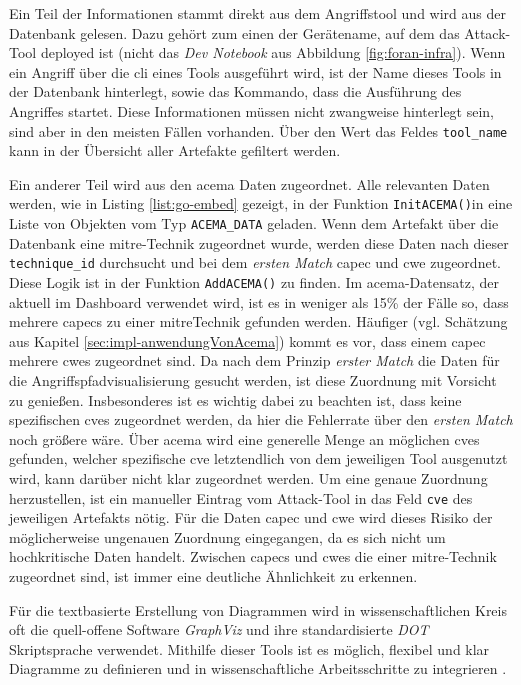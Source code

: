 \par Ein Teil der Informationen stammt direkt aus dem Angriffstool und wird aus der Datenbank gelesen. Dazu gehört zum einen der Gerätename, auf dem das Attack-Tool deployed ist (nicht das \textit{Dev Notebook} aus Abbildung \ref{fig:foran-infra}). Wenn ein Angriff über die \gls{cli} eines Tools ausgeführt wird, ist der Name dieses Tools in der Datenbank hinterlegt, sowie das Kommando, dass die Ausführung des Angriffes startet. Diese Informationen müssen nicht zwangweise hinterlegt sein, sind aber in den meisten Fällen vorhanden. Über den Wert das Feldes \verb|tool_name| kann in der Übersicht aller Artefakte gefiltert werden.
\par Ein anderer Teil wird aus den \gls{acema} Daten zugeordnet. Alle relevanten Daten werden, wie in Listing \ref{list:go-embed} gezeigt, in der Funktion \verb|InitACEMA()|in eine Liste von Objekten vom Typ \verb|ACEMA_DATA| geladen. Wenn dem Artefakt über die Datenbank eine \gls{mitre}-Technik zugeordnet wurde, werden diese Daten nach dieser \verb|technique_id| durchsucht und bei dem \textit{ersten Match} \gls{capec} und \gls{cwe} zugeordnet. Diese Logik ist in der Funktion \verb|AddACEMA()| zu finden. Im \gls{acema}-Datensatz, der aktuell im Dashboard verwendet wird, ist es in weniger als 15\% der Fälle so, dass mehrere \glspl{capec} zu einer \gls{mitre}Technik gefunden werden. Häufiger (vgl. Schätzung aus Kapitel \ref{sec:impl-anwendungVonAcema}) kommt es vor, dass einem \gls{capec} mehrere \glspl{cwe} zugeordnet sind. Da nach dem Prinzip \textit{erster Match} die Daten für die Angriffspfadvisualisierung gesucht werden, ist diese Zuordnung mit Vorsicht zu genießen. Insbesonderes ist es wichtig dabei zu beachten ist, dass keine spezifischen \glspl{cve} zugeordnet werden, da hier die Fehlerrate über den \textit{ersten Match} noch größere wäre. Über \gls{acema} wird eine generelle Menge an möglichen \glspl{cve} gefunden, welcher spezifische \gls{cve} letztendlich von dem jeweiligen Tool ausgenutzt wird, kann darüber nicht klar zugeordnet werden. Um eine genaue Zuordnung herzustellen, ist ein manueller Eintrag vom Attack-Tool in das Feld \verb|cve| des jeweiligen Artefakts nötig. Für die Daten \gls{capec} und \gls{cwe} wird dieses Risiko der möglicherweise ungenauen Zuordnung eingegangen, da es sich nicht um hochkritische Daten handelt. Zwischen \glspl{capec} und \glspl{cwe} die einer \gls{mitre}-Technik zugeordnet sind, ist immer eine deutliche Ähnlichkeit zu erkennen.
\par Für die textbasierte Erstellung von Diagrammen wird in wissenschaftlichen Kreis oft die quell-offene Software \textit{GraphViz} und ihre standardisierte \textit{DOT} Skriptsprache verwendet. Mithilfe dieser Tools ist es möglich, flexibel und klar Diagramme zu definieren und in wissenschaftliche Arbeitsschritte zu integrieren \autocite{Graphviz,DOTLanguage}.
